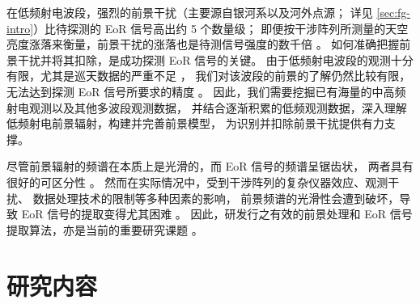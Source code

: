 在低频射电波段，强烈的前景干扰（主要源自银河系以及河外点源；
详见 \autoref{sec:fg-intro}）比待探测的 EoR 信号高出约 5 个数量级；
即便按干涉阵列所测量的天空亮度涨落来衡量，前景干扰的涨落也是待测信号强度的数千倍
\cite{zaroubi2013}。
如何准确把握前景干扰并将其扣除，是成功探测 EoR 信号的关键。
由于低频射电波段的观测十分有限，尤其是巡天数据的严重不足
\cite{deOliveiraCosta2008,zheng2017gal}，
我们对该波段的前景的了解仍然比较有限，无法达到探测 EoR 信号所要求的精度
\cite{liu2012,harker2015,offringa2016,murray2017,procopio2017}。
因此，我们需要挖掘已有海量的中高频射电观测以及其他多波段观测数据，
并结合逐渐积累的低频观测数据，深入理解低频射电前景辐射，构建并完善前景模型，
为识别并扣除前景干扰提供有力支撑。

尽管前景辐射的频谱在本质上是光滑的，而 EoR 信号的频谱呈锯齿状，
两者具有很好的可区分性 \cite{wang2006,jelic2008,harker2009,wang2013}。
然而在实际情况中，受到干涉阵列的复杂仪器效应、观测干扰、
数据处理技术的限制等多种因素的影响，
前景频谱的光滑性会遭到破坏，导致 EoR 信号的提取变得尤其困难
\cite{liu2009ps,labropoulos2009,gehlot2018,mertens2018}。
因此，研发行之有效的前景处理和 EoR 信号提取算法，亦是当前的重要研究课题
\cite{chapman2016,pober2016,zhang2016,thyagarajan2018}。


\section{研究内容}

